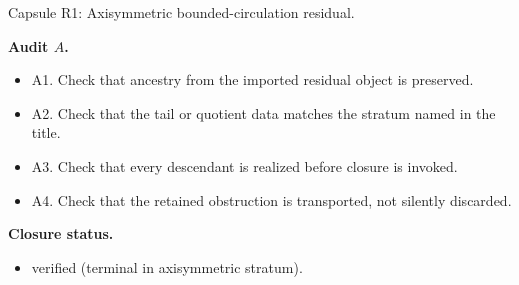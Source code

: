 \documentclass[11pt]{amsart}
\newcommand{\capsulefield}[1]{\par\smallskip\noindent\textbf{#1.}\ }
\begin{document}
\begin{proofcapsule}{Capsule R1: Axisymmetric bounded-circulation residual.}
  \capsulefield{Audit \(A\)}
  \begin{itemize}[leftmargin=1.8em]
  \item A1. Check that ancestry from the imported residual object is preserved.
  \item A2. Check that the tail or quotient data matches the stratum named in the title.
  \item A3. Check that every descendant is realized before closure is invoked.
  \item A4. Check that the retained obstruction is transported, not silently discarded.
  \end{itemize}
  \capsulefield{Closure status}
  \begin{itemize}[leftmargin=1.8em]
  \item verified (terminal in axisymmetric stratum).
  \end{itemize}
\end{proofcapsule}
\end{document}
